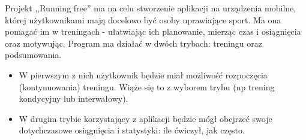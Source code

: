 \nopagebreak
Projekt ,,Running free'' ma na celu stworzenie aplikacji na urządzenia mobilne, której użytkownikami mają docelowo być osoby uprawiające sport. Ma ona pomagać im w treningach - ułatwiając ich planowanie, mierząc czas i osiągnięcia oraz motywując. 
Program ma działać w dwóch trybach: treningu oraz podsumowania.
\begin{itemize}
\item W pierwszym z nich użytkownik będzie miał możliwość rozpoczęcia (kontynuowania) treningu. Wiąże się to z wyborem trybu (np trening kondycyjny lub interwałowy).
\item W drugim trybie korzystający z aplikacji będzie mógł obejrzeć swoje dotychczasowe osiągnięcia i statystyki: ile ćwiczył, jak często. 
\end{itemize}
